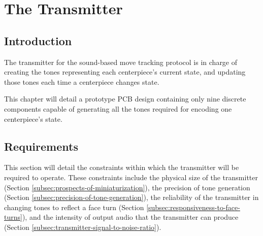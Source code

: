 
\chapter{The Transmitter} %
\label{Chapter6} 


\section{Introduction}
The transmitter for the sound-based move tracking protocol is in charge of creating the tones representing each centerpiece's current state, and updating those tones each time a centerpiece changes state.

This chapter will detail a prototype PCB design containing only nine discrete components capable of generating all the tones required for encoding one centerpiece's state.

\section{Requirements}
\label{sec:transmitter-requirements}
This section will detail the constraints within which the transmitter will be required to operate. These constraints include the physical size of the transmitter (Section \ref{subsec:prospects-of-miniaturization}), the precision of tone generation (Section \ref{subsec:precision-of-tone-generation}), the reliability of the transmitter in changing tones to reflect a face turn (Section \ref{subsec:responsiveness-to-face-turns}), and the intensity of output audio that the transmitter can produce (Section \ref{subsec:transmitter-signal-to-noise-ratio}).

